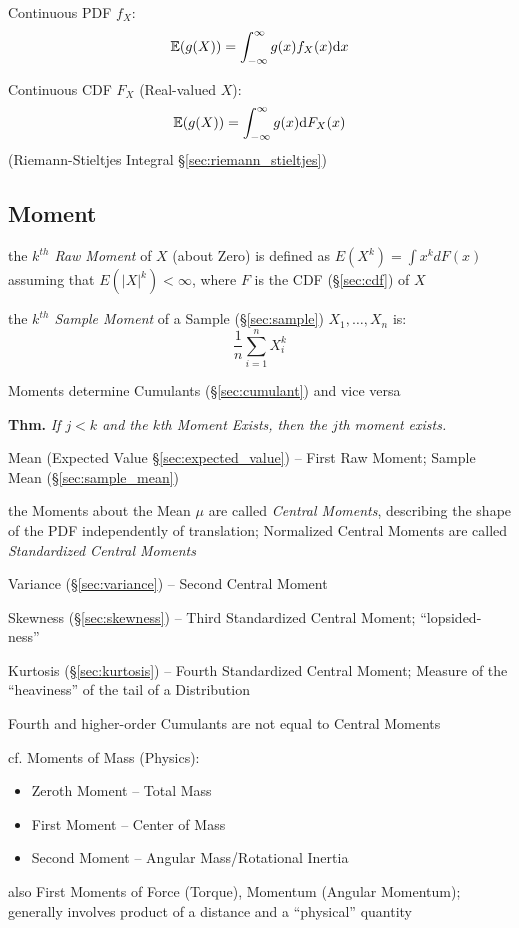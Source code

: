 Continuous PDF $f_X$:
\[
  \mathbb{E}(g(X)) = \int_{-\infty}^\infty g(x) f_X(x) \mathrm{d}x
\]

Continuous CDF $F_X$ (Real-valued $X$):
\[
  \mathbb{E}(g(X)) = \int_{-\infty}^\infty g(x) \mathrm{d}F_X(x)
\]
(Riemann-Stieltjes Integral \S\ref{sec:riemann_stieltjes})



\subsection{Moment}\label{sec:moment}

the \emph{$k^{th}$ Raw Moment} of $X$ (about Zero) is defined as $E(X^k) = \int
x^k dF(x)$ assuming that $E(|X|^k) < \infty$, where $F$ is the CDF
(\S\ref{sec:cdf}) of $X$

the \emph{$k^{th}$ Sample Moment} of a Sample (\S\ref{sec:sample})
$X_1, \ldots, X_n$ is:
\[
  \frac{1}{n}\sum_{i=1}^n X^k_{i}
\]

Moments determine Cumulants (\S\ref{sec:cumulant}) and vice versa

\textbf{Thm.} \emph{If $j < k$ and the $k$th Moment Exists, then the $j$th
  moment exists.}

Mean (Expected Value \S\ref{sec:expected_value}) -- First Raw Moment; Sample
Mean (\S\ref{sec:sample_mean})

the Moments about the Mean $\mu$ are called \emph{Central Moments}, describing
the shape of the PDF independently of translation; Normalized Central Moments
are called \emph{Standardized Central Moments}

Variance (\S\ref{sec:variance}) -- Second Central Moment

Skewness (\S\ref{sec:skewness}) -- Third Standardized Central Moment;
``lopsided-ness''

Kurtosis (\S\ref{sec:kurtosis}) -- Fourth Standardized Central Moment; Measure
of the ``heaviness'' of the tail of a Distribution

Fourth and higher-order Cumulants are not equal to Central Moments

cf. Moments of Mass (Physics):
\begin{itemize}
  \item Zeroth Moment -- Total Mass
  \item First Moment -- Center of Mass
  \item Second Moment -- Angular Mass/Rotational Inertia
\end{itemize}
also First Moments of Force (Torque), Momentum (Angular Momentum); generally
involves product of a distance and a ``physical'' quantity

